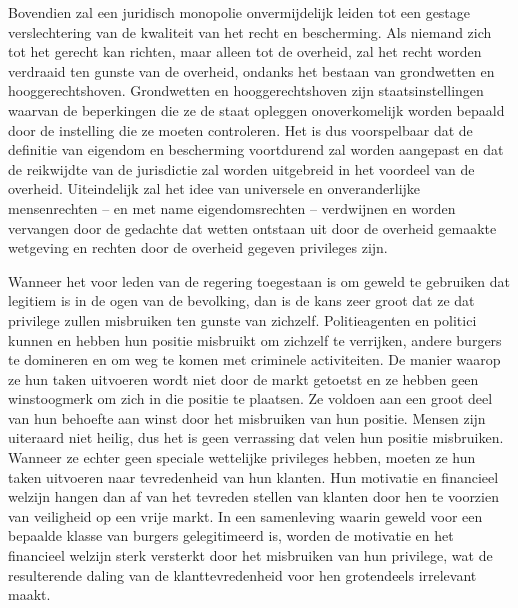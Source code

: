 \begin{blockquotebox}
Bovendien zal een juridisch monopolie onvermijdelijk leiden tot een gestage verslechtering van de kwaliteit van het recht en bescherming. Als niemand zich tot het gerecht kan richten, maar alleen tot de overheid, zal het recht worden verdraaid ten gunste van de overheid, ondanks het bestaan van grondwetten en hooggerechtshoven. Grondwetten en hooggerechtshoven zijn staatsinstellingen waarvan de beperkingen die ze de staat opleggen onoverkomelijk worden bepaald door de instelling die ze moeten controleren. Het is dus voorspelbaar dat de definitie van eigendom en bescherming voortdurend zal worden aangepast en dat de reikwijdte van de jurisdictie zal worden uitgebreid in het voordeel van de overheid. Uiteindelijk zal het idee van universele en onveranderlijke mensenrechten -- en met name eigendomsrechten -- verdwijnen en worden vervangen door de gedachte dat wetten ontstaan uit door de overheid gemaakte wetgeving en rechten door de overheid gegeven privileges zijn.\footnotemark
\end{blockquotebox}
\autocite{207}

Wanneer het voor leden van de regering toegestaan is om geweld te gebruiken dat legitiem is in de ogen van de bevolking, dan is de kans zeer groot dat ze dat privilege zullen misbruiken ten gunste van zichzelf. Politieagenten en politici kunnen en hebben hun positie misbruikt om zichzelf te verrijken, andere burgers te domineren en om weg te komen met criminele activiteiten. De manier waarop ze hun taken uitvoeren wordt niet door de markt getoetst en ze hebben geen winstoogmerk om zich in die positie te plaatsen. Ze voldoen aan een groot deel van hun behoefte aan winst door het misbruiken van hun positie. Mensen zijn uiteraard niet heilig, dus het is geen verrassing dat velen hun positie misbruiken. Wanneer ze echter geen speciale wettelijke privileges hebben, moeten ze hun taken uitvoeren naar tevredenheid van hun klanten. Hun motivatie en financieel welzijn hangen dan af van het tevreden stellen van klanten door hen te voorzien van veiligheid op een vrije markt. In een samenleving waarin geweld voor een bepaalde klasse van burgers gelegitimeerd is, worden de motivatie en het financieel welzijn sterk versterkt door het misbruiken van hun privilege, wat de resulterende daling van de klanttevredenheid voor hen grotendeels irrelevant maakt.

